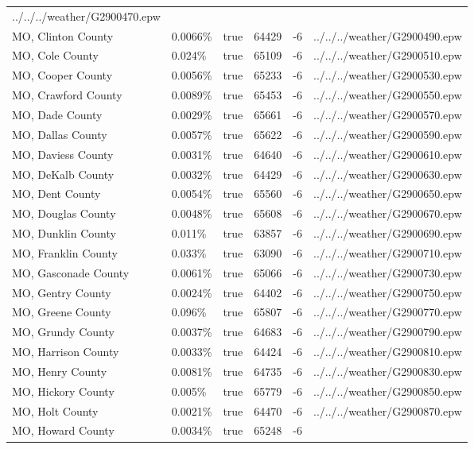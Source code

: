 \begin{longtable}[]{@{}llllll@{}}
../../../weather/G2900470.epw \\
MO, Clinton County & 0.0066\% & true & 64429 & -6 &
../../../weather/G2900490.epw \\
MO, Cole County & 0.024\% & true & 65109 & -6 &
../../../weather/G2900510.epw \\
MO, Cooper County & 0.0056\% & true & 65233 & -6 &
../../../weather/G2900530.epw \\
MO, Crawford County & 0.0089\% & true & 65453 & -6 &
../../../weather/G2900550.epw \\
MO, Dade County & 0.0029\% & true & 65661 & -6 &
../../../weather/G2900570.epw \\
MO, Dallas County & 0.0057\% & true & 65622 & -6 &
../../../weather/G2900590.epw \\
MO, Daviess County & 0.0031\% & true & 64640 & -6 &
../../../weather/G2900610.epw \\
MO, DeKalb County & 0.0032\% & true & 64429 & -6 &
../../../weather/G2900630.epw \\
MO, Dent County & 0.0054\% & true & 65560 & -6 &
../../../weather/G2900650.epw \\
MO, Douglas County & 0.0048\% & true & 65608 & -6 &
../../../weather/G2900670.epw \\
MO, Dunklin County & 0.011\% & true & 63857 & -6 &
../../../weather/G2900690.epw \\
MO, Franklin County & 0.033\% & true & 63090 & -6 &
../../../weather/G2900710.epw \\
MO, Gasconade County & 0.0061\% & true & 65066 & -6 &
../../../weather/G2900730.epw \\
MO, Gentry County & 0.0024\% & true & 64402 & -6 &
../../../weather/G2900750.epw \\
MO, Greene County & 0.096\% & true & 65807 & -6 &
../../../weather/G2900770.epw \\
MO, Grundy County & 0.0037\% & true & 64683 & -6 &
../../../weather/G2900790.epw \\
MO, Harrison County & 0.0033\% & true & 64424 & -6 &
../../../weather/G2900810.epw \\
MO, Henry County & 0.0081\% & true & 64735 & -6 &
../../../weather/G2900830.epw \\
MO, Hickory County & 0.005\% & true & 65779 & -6 &
../../../weather/G2900850.epw \\
MO, Holt County & 0.0021\% & true & 64470 & -6 &
../../../weather/G2900870.epw \\
MO, Howard County & 0.0034\% & true & 65248 & -6 &

\end{longtable}
